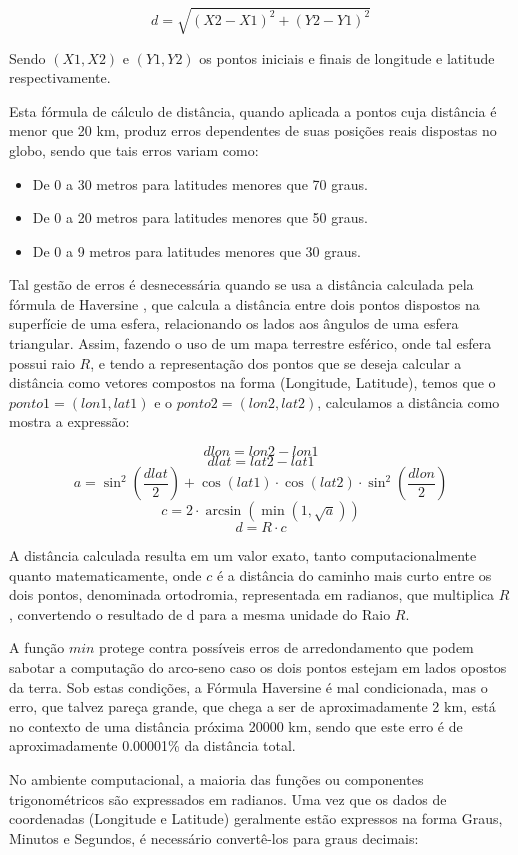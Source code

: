 \[d = \sqrt{(X2 - X1)^2 + (Y2 - Y1)^2}\]

Sendo \((X1, X2)\) e \((Y1,Y2)\) os pontos iniciais e finais de longitude e latitude respectivamente.

Esta fórmula de cálculo de distância, quando aplicada a pontos cuja distância é menor que 20 km, produz erros dependentes de suas posições reais dispostas no globo, sendo que tais erros variam como:
\begin{itemize}
\item De 0 a 30 metros para latitudes menores que 70 graus.
\item De 0 a 20 metros para latitudes menores que 50 graus. 
\item De 0 a 9 metros para latitudes menores que 30 graus.
\end{itemize}

Tal gestão de erros é desnecessária quando se usa a distância calculada pela fórmula de Haversine \cite{shumaker1984astronomical}, que calcula a distância entre dois pontos dispostos na superfície de uma esfera, relacionando os lados aos ângulos de uma esfera triangular. Assim, fazendo o uso de um mapa terrestre esférico, onde tal esfera possui raio \(R\), e tendo a representação dos pontos que se deseja calcular a distância como vetores compostos na forma (Longitude, Latitude), temos que o \(ponto1 = (lon1,lat1)\) e o \(ponto2 = (lon2,lat2)\), calculamos a distância como mostra a expressão:

\[dlon = lon2 - lon1\]
\[dlat = lat2 - lat1\]
\[a = \sin^2\left(\frac{dlat}{2}\right) + \cos(lat1) \cdot \cos(lat2) \cdot \sin^2\left(\frac{dlon}{2}\right)\]
\[c = 2 \cdot \arcsin(\min(1,\sqrt{a}))\]
\[d = R \cdot c\]

A distância calculada resulta em um valor exato, tanto computacionalmente quanto matematicamente, onde \(c\) é a distância do caminho mais curto entre os dois pontos, denominada ortodromia, representada em radianos, que multiplica \(R\), convertendo o resultado de d para a mesma unidade do Raio \(R\). 

A função \(min\) protege contra possíveis erros de arredondamento que podem sabotar a computação do arco-seno caso os dois pontos estejam em lados opostos da terra. Sob estas condições, a Fórmula Haversine é mal condicionada, mas o erro, que talvez pareça grande, que chega a ser de aproximadamente 2 km, está no contexto de uma distância próxima 20000 km, sendo que este erro é de aproximadamente 0.00001\% da distância total.

No ambiente computacional, a maioria das funções ou componentes trigonométricos são expressados em radianos. Uma vez que os dados de coordenadas (Longitude e Latitude) geralmente estão expressos na forma Graus, Minutos e Segundos, é necessário convertê-los para graus decimais:

